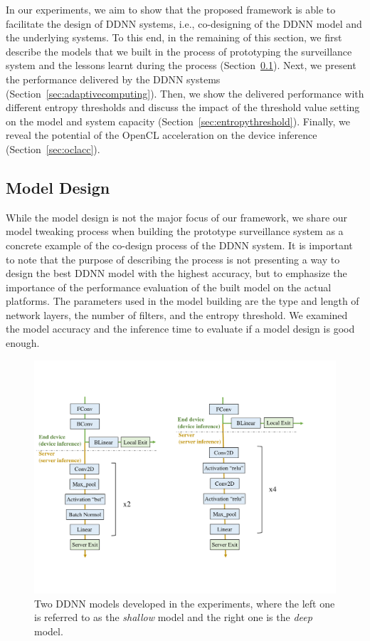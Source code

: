 \documentclass[format=acmsmall, review=false, screen=true]{acmart}
\def\sectionname{Section}
\begin{document}
In our experiments, we aim to show that the proposed framework is able to facilitate the design of DDNN systems, i.e., co-designing of the DDNN model and the underlying systems. To this end, in the remaining of this section, we first describe the models that we built in the process of prototyping the surveillance system and the lessons learnt during the process (\sectionname~\ref{sec:modeldesign}). Next, we present the performance delivered by the DDNN systems (\sectionname~\ref{sec:adaptivecomputing}).
Then, we show the delivered performance with different entropy thresholds and discuss the impact of the threshold value setting on the model and system capacity (\sectionname~\ref{sec:entropythreshold}).
Finally, we reveal the potential of the OpenCL acceleration on the device inference (\sectionname~\ref{sec:oclacc}).


\subsection{Model Design}
\label{sec:modeldesign}

While the model design is not the major focus of our framework, we share our model tweaking process when building the prototype surveillance system as a concrete example of the co-design process of the DDNN system. It is important to note that the purpose of describing the process is not presenting a way to design the best DDNN model with the highest accuracy, but to emphasize the importance of the performance evaluation of the built model on the actual platforms. The parameters used in the model building are the type and length of network layers, the number of filters, and the entropy threshold. We examined the model accuracy and the inference time to evaluate if a model design is good enough.

	\begin{figure}[tbh!!]
        \centering

        \includegraphics[width=.7\columnwidth]{figure/cifar10_weak_good.pdf}

        \caption{Two DDNN models developed in the experiments, where the left one is referred to as the \emph{shallow} model and the right one is the \emph{deep} model.}
        \label{fig:cifarmodels} %
    \end{figure}
\end{document}
